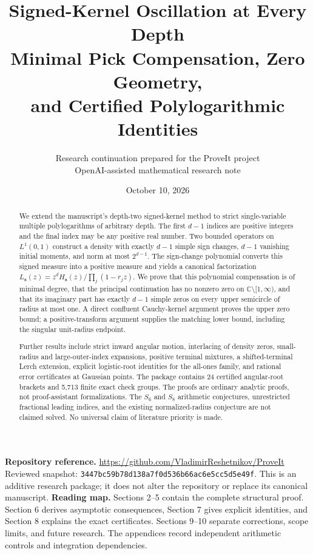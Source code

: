 \documentclass[11pt]{article}
\title{\textbf{Signed-Kernel Oscillation at Every Depth}\\[6pt]
\large Minimal Pick Compensation, Zero Geometry,\\and Certified Polylogarithmic Identities}
\author{Research continuation prepared for the ProveIt project\\
\small OpenAI-assisted mathematical research note}
\date{October 10, 2026}
\numberwithin{equation}{section}
\theoremstyle{definition}
\newcommand{\bbC}{\mathbb C}
\newcommand{\svec}{\boldsymbol{s}}
\newcommand{\repoSHA}{3447bc59b78d138a7f0d536b66ac6e5cc5d5e49f}
\begin{document}
\maketitle
\thispagestyle{empty}
\begin{abstract}
We extend the manuscript's depth-two signed-kernel method to strict
single-variable multiple polylogarithms of arbitrary depth. The first
$d-1$ indices are positive integers and the final index may be any positive
real number. Two bounded operators on $L^1(0,1)$ construct a density with
exactly $d-1$ simple sign changes, $d-1$ vanishing initial moments, and
norm at most $2^{d-1}$. The sign-change polynomial converts this signed
measure into a positive measure and yields a canonical factorization
$L_{\svec}(z)=z^dH_{\svec}(z)/\prod_j(1-r_jz)$. We prove that this
polynomial compensation is of minimal degree, that the principal
continuation has no nonzero zero on $\bbC\setminus[1,\infty)$, and that
its imaginary part has exactly $d-1$ simple zeros on every upper
semicircle of radius at most one. A direct confluent Cauchy-kernel argument
proves the upper zero bound; a positive-transform argument supplies the
matching lower bound, including the singular unit-radius endpoint.

Further results include strict inward angular motion, interlacing of density
zeros, small-radius and
large-outer-index expansions, positive terminal mixtures, a shifted-terminal
Lerch extension, explicit logistic-root identities for the all-ones family,
and rational error certificates at Gaussian points. The package contains
24 certified angular-root brackets and 5,713 finite exact check groups.
The proofs are ordinary analytic proofs, not proof-assistant formalizations.
The $S_6$ and $S_8$ arithmetic conjectures, unrestricted fractional leading
indices, and the existing normalized-radius conjecture are not claimed
solved. No universal claim of literature priority is made.
\end{abstract}
\vfill
\noindent\small\textbf{Repository reference.}
\url{https://github.com/VladimirReshetnikov/ProveIt}\\
Reviewed snapshot: \texttt{\repoSHA}. This is an additive research package;
it does not alter the repository or replace its canonical manuscript.
\clearpage
\setcounter{tocdepth}{1}
\hypersetup{bookmarksdepth=2}
\tableofcontents
\vspace{1.5em}
\noindent\textbf{Reading map.} Sections 2--5 contain the complete structural proof.
Section 6 derives asymptotic consequences, Section 7 gives explicit identities,
and Section 8 explains the exact certificates. Sections 9--10 separate
corrections, scope limits, and future research. The appendices record
independent arithmetic controls and integration dependencies.
\clearpage










\appendix



\end{document}
